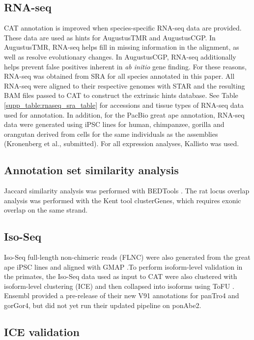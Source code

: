 \documentclass[fleqn,10pt]{wlscirep}
\begin{document}
\subsection*{RNA-seq}

CAT annotation is improved when species-specific RNA-seq data are provided. These data are used as hints for AugustusTMR and AugustusCGP. In AugustusTMR, RNA-seq helps fill in missing information in the alignment, as well as resolve evolutionary changes. In AugustusCGP, RNA-seq additionally helps prevent false positives inherent in \textit{ab initio} gene finding. For these reasons, RNA-seq was obtained from SRA for all species annotated in this paper. All RNA-seq were aligned to their respective genomes with STAR  \citep{dobin2013star} and the resulting BAM files passed to CAT to construct the extrinsic hints database. See Table \ref{supp_table:rnaseq_sra_table} for accessions and tissue types of RNA-seq data used for annotation. In addition, for the PacBio great ape annotation, RNA-seq data were generated using iPSC lines for human, chimpanzee, gorilla and orangutan derived from cells for the same individuals as the assemblies (Kronenberg et al., submitted). For all expression analyses, Kallisto  \citep{bray2015near} was used.

\subsection*{Annotation set similarity analysis}

Jaccard similarity analysis was performed with BEDTools  \citep{quinlan2010bedtools}. The rat locus overlap analysis was performed with the Kent tool clusterGenes, which requires exonic overlap on the same strand.

\subsection*{Iso-Seq}

Iso-Seq full-length non-chimeric reads (FLNC) were also generated from the great ape iPSC lines and aligned with GMAP  \citep{wu2005gmap}.To perform isoform-level validation in the primates, the Iso-Seq data used as input to CAT were also clustered with isoform-level clustering (ICE) and then collapsed into isoforms using ToFU  \citep{gordon2015widespread}. Ensembl provided a pre-release of their new V91 annotations for panTro4 and gorGor4, but did not yet run their updated pipeline on ponAbe2.

\subsection*{ICE validation}
\end{document}
